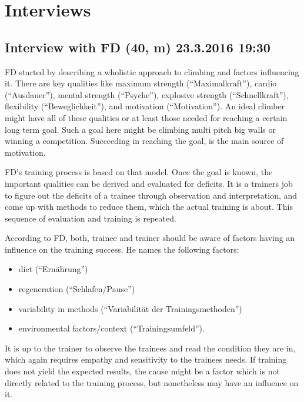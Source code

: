 \section{Interviews}

\subsection{Interview with FD (40, m) 23.3.2016 19:30}
\label{appendix:interview_f_d}

FD started by describing a wholistic approach to climbing and factors influencing it. There are key
qualities like maximum strength (\enquote{Maximalkraft}), cardio (\enquote{Ausdauer}), mental strength (\enquote{Psyche}), explosive strength (\enquote{Schnellkraft}), flexibility (\enquote{Beweglichkeit}), and motivation (\enquote{Motivation}). An ideal climber might have all of these qualities or at least those needed for reaching a certain long term goal. Such a goal here might be climbing multi pitch big walls or winning a competition. Succeeding in reaching the goal, is the main source of motivation. 

FD's training process is based on that model. Once the goal is known, the important qualities can be derived and evaluated for deficits. It is a trainers job to figure out the deficits of a trainee through observation and interpretation, and come up with methods to reduce them, which the actual training is about. This sequence of evaluation and training is repeated.

According to FD, both, trainee and trainer should be aware of factors having an influence on the
training success. He names the following factors: 

\begin{itemize}
\item diet (\enquote{Ernährung})
\item regeneration (\enquote{Schlafen/Pause})
\item variability in methods (\enquote{Variabilität der Trainingsmethoden})
\item environmental factors/context (\enquote{Trainingsumfeld}).
\end{itemize}

It is up to the trainer to observe the trainees and read the condition they are in, which again requires empathy and sensitivity to the trainees needs. If training does not yield the expected results, the cause might be a factor which is not directly related to the training process, but nonetheless may have an influence on it.

